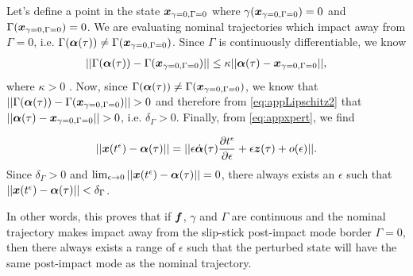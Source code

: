 \documentclass[../DC2017114Bouma.tex]{subfiles}
\begin{document}
Let's define a point in the state ${\boldsymbol{x}}_{\gamma=0,\Gamma=0}$ where $\gamma({\boldsymbol{x}}_{\gamma=0,\Gamma=0})=0$ and $\Gamma({\boldsymbol{x}}_{\gamma=0,\Gamma=0})=0$. We are evaluating nominal trajectories which impact away from $\Gamma = 0$, i.e. $\Gamma(\boldsymbol{\alpha}(\tau))\neq \Gamma({\boldsymbol{x}}_{\gamma=0,\Gamma=0})$. Since $\Gamma$ is continuously differentiable, we know
\begin{align}
||\Gamma(\boldsymbol{\alpha}(\tau)) - \Gamma({\boldsymbol{x}}_{\gamma=0,\Gamma=0})||\leq \kappa||\boldsymbol{\alpha}(\tau)-{\boldsymbol{x}}_{\gamma=0,\Gamma=0}||,\label{eq:appLipschitz2}
\end{align}
where $\kappa>0$ \cite{Leine2008}. Now, since $\Gamma(\boldsymbol{\alpha}(\tau))\neq \Gamma({\boldsymbol{x}}_{\gamma=0,\Gamma=0})$, we know that $||\Gamma(\alphab(\tau)) - \Gamma(\xb_{\gamma=0,\Gamma=0})||>0$ and therefore from \eqref{eq:appLipschitz2} that $||\alphab(\tau)-\xb_{\gamma=0,\Gamma=0}||>0$, i.e. $\delta_{\Gamma} >0$. Finally, from \eqref{eq:appxpert}, we find

\begin{align}
||{\boldsymbol{x}}(t^\epsilon) - \boldsymbol{\alpha}(\tau)|| = ||\epsilon\dot{\boldsymbol{\alpha}}(\tau)\frac{\partial t^\epsilon}{\partial \epsilon} + \epsilon{\boldsymbol{z}}(\tau) + o(\epsilon)||.
\end{align}
Since $\delta_{\Gamma} > 0$ and $\lim_{\epsilon\rightarrow 0}||{\boldsymbol{x}}(t^\epsilon) - \boldsymbol{\alpha}(\tau)||=0$, there always exists an $\epsilon$ such that $||{\boldsymbol{x}}(t^\epsilon) - \boldsymbol{\alpha}(\tau)||<\delta_{\Gamma}$. 

In other words, this proves that if ${\boldsymbol{f}}$, $\gamma$ and $\Gamma$ are continuous and the nominal trajectory makes impact away from the slip-stick post-impact mode border $\Gamma = 0$, then there always exists a range of $\epsilon$ such that the perturbed state will have the same post-impact mode as the nominal trajectory.
\end{document}
